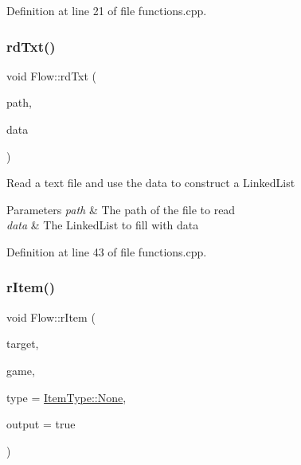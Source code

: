 Definition at line 21 of file functions.\+cpp.

\hypertarget{namespace_flow_ab782d7fd4c61d0f51cb745bc19ba4158}{}\label{namespace_flow_ab782d7fd4c61d0f51cb745bc19ba4158} 
\subsubsection{\texorpdfstring{rd\+Txt()}{rdTxt()}\hspace{0.1cm}{\footnotesize\ttfamily [2/2]}}
{\footnotesize\ttfamily void Flow\+::rd\+Txt (\begin{DoxyParamCaption}\item[{const std\+::string \&}]{path,  }\item[{\hyperlink{class_collections_1_1_linked_list}{Collections\+::\+Linked\+List}$<$ std\+::string $>$ \&}]{data }\end{DoxyParamCaption})}

Read a text file and use the data to construct a Linked\+List 
\begin{DoxyParams}{Parameters}
{\em path} & The path of the file to read \\
\hline
{\em data} & The Linked\+List to fill with data \\
\hline
\end{DoxyParams}


Definition at line 43 of file functions.\+cpp.

\hypertarget{namespace_flow_a26033855ea2a0a990eeebb4904d89a3f}{}\label{namespace_flow_a26033855ea2a0a990eeebb4904d89a3f} 
\subsubsection{\texorpdfstring{r\+Item()}{rItem()}}
{\footnotesize\ttfamily void Flow\+::r\+Item (\begin{DoxyParamCaption}\item[{\hyperlink{class_flow_1_1_actor}{Actor} \&}]{target,  }\item[{\hyperlink{class_flow_1_1_game}{Game} \&}]{game,  }\item[{\hyperlink{namespace_flow_a09368c0b65b3d1bc5c227ed1046c8bca}{Item\+Type}}]{type = {\ttfamily \hyperlink{namespace_flow_a09368c0b65b3d1bc5c227ed1046c8bcaa6adf97f83acf6453d4a6a4b1070f3754}{Item\+Type\+::\+None}},  }\item[{bool}]{output = {\ttfamily true} }\end{DoxyParamCaption})}

